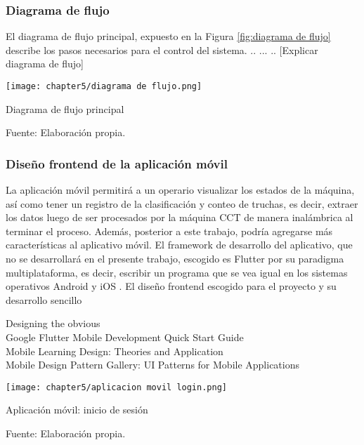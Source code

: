 \subsubsection{Diagrama de flujo}

El diagrama de flujo principal, expuesto en la Figura \ref{fig:diagrama de flujo} describe los pasos necesarios para el control del sistema. .. ... .. [Explicar diagrama de flujo]

\begin{myfigure}[H]
	\centering
	\texttt{[image: chapter5/diagrama de flujo.png]}
	\caption{Diagrama de flujo principal}
	\begin{myflushleftportland}
		Fuente: Elaboración propia.
	\end{myflushleftportland}
	\label{fig:diagrama de flujo}
\end{myfigure}


\subsubsection{Diseño frontend de la aplicación móvil}

La aplicación móvil permitirá a un operario visualizar los estados de la máquina, así como tener un registro de la clasificación y conteo de truchas, es decir, extraer los datos luego de ser procesados por la máquina CCT de manera inalámbrica al terminar el proceso. Además, posterior a este trabajo, podría agregarse más características al aplicativo móvil. El framework de desarrollo del aplicativo, que no se desarrollará en el presente trabajo, escogido es Flutter por su paradigma multiplataforma, es decir, escribir un programa que se vea igual en los sistemas operativos Android y iOS \cite{Simone2020}. El diseño frontend escogido para el proyecto y su desarrollo sencillo 

Designing the obvious
\cite{Joekman2010} \\
Google Flutter Mobile Development Quick Start Guide
\cite{PrajyotMainkar2019} \\
Mobile Learning Design: Theories and Application
\cite{Churchill2016} \\
Mobile Design Pattern Gallery: UI Patterns for Mobile Applications
\cite{Neil2012}


\begin{myfigure}[H]
	\centering
	\texttt{[image: chapter5/aplicacion movil login.png]}
	\caption{Aplicación móvil: inicio de sesión}
	\begin{myflushleftportland}
		Fuente: Elaboración propia.
	\end{myflushleftportland}
	\label{fig:aplicacion movil login}
\end{myfigure}


